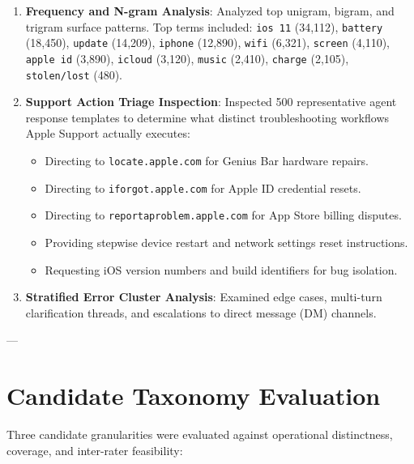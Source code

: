 \documentclass[11pt,a4paper]{article}
\begin{document}
\begin{enumerate}[leftmargin=*]
    \item \textbf{Frequency and N-gram Analysis}: Analyzed top unigram, bigram, and trigram surface patterns. Top terms included: \texttt{ios 11} (34,112), \texttt{battery} (18,450), \texttt{update} (14,209), \texttt{iphone} (12,890), \texttt{wifi} (6,321), \texttt{screen} (4,110), \texttt{apple id} (3,890), \texttt{icloud} (3,120), \texttt{music} (2,410), \texttt{charge} (2,105), \texttt{stolen/lost} (480).
    \item \textbf{Support Action Triage Inspection}: Inspected 500 representative agent response templates to determine what distinct troubleshooting workflows Apple Support actually executes:
    \begin{itemize}
        \item Directing to \texttt{locate.apple.com} for Genius Bar hardware repairs.
        \item Directing to \texttt{iforgot.apple.com} for Apple ID credential resets.
        \item Directing to \texttt{reportaproblem.apple.com} for App Store billing disputes.
        \item Providing stepwise device restart and network settings reset instructions.
        \item Requesting iOS version numbers and build identifiers for bug isolation.
    \end{itemize}
    \item \textbf{Stratified Error Cluster Analysis}: Examined edge cases, multi-turn clarification threads, and escalations to direct message (DM) channels.
\end{enumerate}

---

\section{Candidate Taxonomy Evaluation}

Three candidate granularities were evaluated against operational distinctness, coverage, and inter-rater feasibility:
\end{document}
